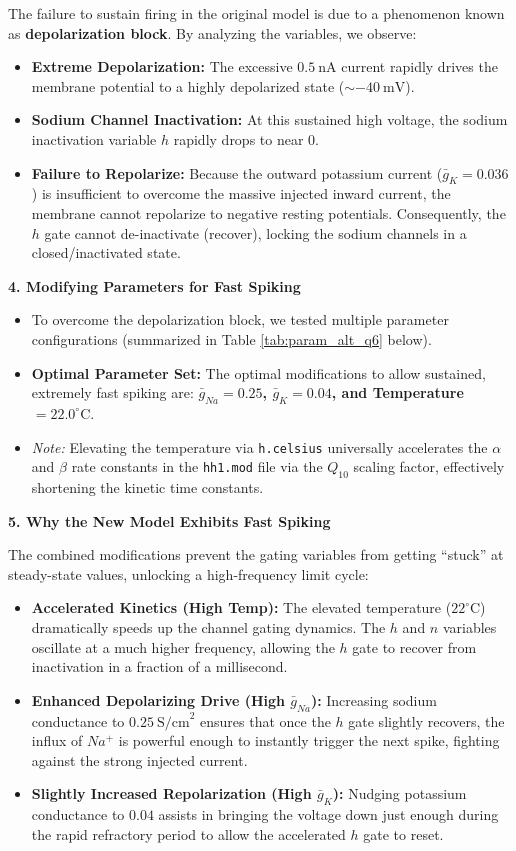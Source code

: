 \documentclass{article}
\begin{document}
\begin{answerbox}
The failure to sustain firing in the original model is due to a phenomenon known as \textbf{depolarization block}. By analyzing the variables, we observe:
\begin{itemize}
    \item \textbf{Extreme Depolarization:} The excessive $0.5\ \text{nA}$ current rapidly drives the membrane potential to a highly depolarized state ($\sim -40\ \text{mV}$).
    \item \textbf{Sodium Channel Inactivation:} At this sustained high voltage, the sodium inactivation variable $h$ rapidly drops to near 0. 
    \item \textbf{Failure to Repolarize:} Because the outward potassium current ($\bar{g}_K = 0.036$) is insufficient to overcome the massive injected inward current, the membrane cannot repolarize to negative resting potentials. Consequently, the $h$ gate cannot de-inactivate (recover), locking the sodium channels in a closed/inactivated state.
\end{itemize}

\textbf{4. Modifying Parameters for Fast Spiking}
\begin{itemize}
    \item To overcome the depolarization block, we tested multiple parameter configurations (summarized in Table \ref{tab:param_alt_q6} below).
    \item \textbf{Optimal Parameter Set:} The optimal modifications to allow sustained, extremely fast spiking are: \textbf{$\bar{g}_{Na} = 0.25$, $\bar{g}_K = 0.04$, and Temperature $= 22.0^\circ\text{C}$}.
    \item \textit{Note:} Elevating the temperature via \texttt{h.celsius} universally accelerates the $\alpha$ and $\beta$ rate constants in the \texttt{hh1.mod} file via the $Q_{10}$ scaling factor, effectively shortening the kinetic time constants.
\end{itemize}

\textbf{5. Why the New Model Exhibits Fast Spiking}

The combined modifications prevent the gating variables from getting ``stuck'' at steady-state values, unlocking a high-frequency limit cycle:
\begin{itemize}
    \item \textbf{Accelerated Kinetics (High Temp):} The elevated temperature ($22^\circ\text{C}$) dramatically speeds up the channel gating dynamics. The $h$ and $n$ variables oscillate at a much higher frequency, allowing the $h$ gate to recover from inactivation in a fraction of a millisecond.
    \item \textbf{Enhanced Depolarizing Drive (High $\bar{g}_{Na}$):} Increasing sodium conductance to $0.25\ \text{S/cm}^2$ ensures that once the $h$ gate slightly recovers, the influx of $Na^+$ is powerful enough to instantly trigger the next spike, fighting against the strong injected current.
    \item \textbf{Slightly Increased Repolarization (High $\bar{g}_K$):} Nudging potassium conductance to $0.04$ assists in bringing the voltage down just enough during the rapid refractory period to allow the accelerated $h$ gate to reset.
\end{itemize}


\end{answerbox}
\end{document}
